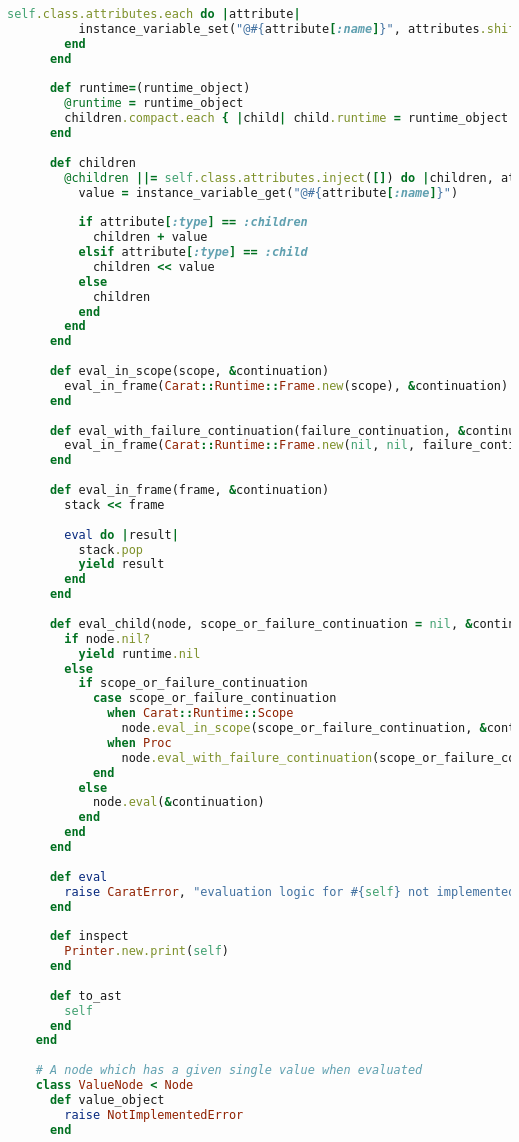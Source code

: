 \begin{lstlisting}[title={\small\ttfamily\bfseries ast/ast.rb},language=Ruby]
        self.class.attributes.each do |attribute|
          instance_variable_set("@#{attribute[:name]}", attributes.shift || attribute[:default])
        end
      end
      
      def runtime=(runtime_object)
        @runtime = runtime_object
        children.compact.each { |child| child.runtime = runtime_object if child.is_a?(Node) }
      end
      
      def children
        @children ||= self.class.attributes.inject([]) do |children, attribute|
          value = instance_variable_get("@#{attribute[:name]}")
          
          if attribute[:type] == :children
            children + value
          elsif attribute[:type] == :child
            children << value
          else
            children
          end
        end
      end
      
      def eval_in_scope(scope, &continuation)
        eval_in_frame(Carat::Runtime::Frame.new(scope), &continuation)
      end
      
      def eval_with_failure_continuation(failure_continuation, &continuation)
        eval_in_frame(Carat::Runtime::Frame.new(nil, nil, failure_continuation), &continuation)
      end
      
      def eval_in_frame(frame, &continuation)
        stack << frame
        
        eval do |result|
          stack.pop
          yield result
        end
      end
      
      def eval_child(node, scope_or_failure_continuation = nil, &continuation)
        if node.nil?
          yield runtime.nil
        else
          if scope_or_failure_continuation
            case scope_or_failure_continuation
              when Carat::Runtime::Scope
                node.eval_in_scope(scope_or_failure_continuation, &continuation)
              when Proc
                node.eval_with_failure_continuation(scope_or_failure_continuation, &continuation)
            end
          else
            node.eval(&continuation)
          end
        end
      end
      
      def eval
        raise CaratError, "evaluation logic for #{self} not implemented"
      end
      
      def inspect
        Printer.new.print(self)
      end
      
      def to_ast
        self
      end
    end
    
    # A node which has a given single value when evaluated
    class ValueNode < Node
      def value_object
        raise NotImplementedError
      end
      

\end{lstlisting}
